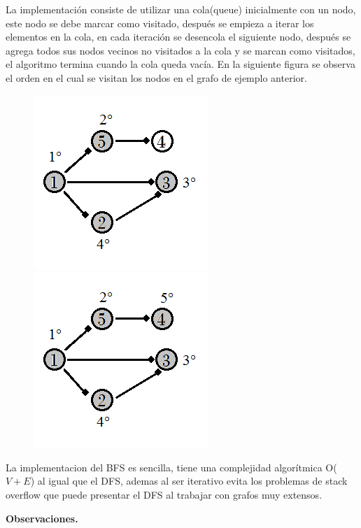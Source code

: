 \documentclass[12pt, a4paper]{article}
\newcommand\cppfile[2][]{

}
\newcommand{\subtitulo}[1]{\begin{center}\textbf{#1}\end{center}}
\begin{document}
	La implementación consiste de utilizar una cola(queue) inicialmente con un nodo, este nodo se debe marcar como
	visitado, después se empieza a iterar los elementos en la cola, en cada iteración se desencola el siguiente nodo,
	después se agrega todos sus nodos vecinos no visitados a la cola y se marcan como visitados, el algoritmo termina
	cuando la cola queda vacía. En la siguiente figura se observa el orden en el cual se visitan los nodos en el grafo
	de ejemplo anterior.
	
	\begin{figure}[!htb]
			\centering
			\includegraphics[scale=1]{Grafos/imagenes/BFS1}
			\caption{}%
		\endminipage
			\centering
			\includegraphics[scale=1]{Grafos/imagenes/BFS2}
			\caption{}%
		\endminipage
	\end{figure}	
	
	La implementacion del BFS es sencilla, tiene una complejidad algorítmica O($V+E$) al igual que el DFS, ademas al 
	ser iterativo evita los problemas de stack overflow que puede presentar el DFS al trabajar con grafos muy extensos.	
	\cppfile[8-25]{Grafos/codigos/BFS.cpp}
	
	\subtitulo{Observaciones.}
	
\end{document}
